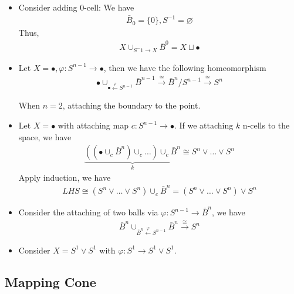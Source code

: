 \documentclass[Total.tex]{subfiles}
\begin{document}
	
	\begin{example}
		\begin{itemize}
			\item Consider adding $0$-cell: We have
			\begin{gather*}
				\bar{B}_0=\{0\},S^{-1}=\varnothing
			\end{gather*}
			Thus,
			\begin{gather*}
				X\cup_{S^-1\rightarrow X} \bar{B}^0=X\sqcup \bullet
			\end{gather*}
			\item Let $X=\bullet,\varphi:S^{n-1}\rightarrow \bullet$, then we have the following homeomorphism
			\begin{gather*}
				\bullet\cup_{\bullet\stackrel{\varphi}{\leftarrow}S^{n-1}} \bar{B}^{n-1}\stackrel{\cong}{\rightarrow} \bar{B}^n/S^{n-1}\stackrel{\cong}{\rightarrow} S^n
			\end{gather*}
			
			When $n=2$, attaching the boundary to the point.
			\item Let $X=\bullet$ with attaching map $c:S^{n-1}\rightarrow \bullet$. If we attaching $k$ n-cells to the space, we have
			\begin{gather*}
				\underbrace{((\bullet \cup_c \bar{B}^n)\cup_c\dots)\cup_c \bar{B}^n}_{k}\cong S^n\vee\dots\vee S^n
			\end{gather*}
			Apply induction, we have
			\begin{gather*}
				LHS\cong (S^n\vee\dots\vee S^n)\cup_c \bar{B}^n=(S^n\vee\dots\vee S^n)\vee S^n
			\end{gather*}
			\item Consider the attaching of two balls via $\varphi:S^{n-1}\rightarrow\bar{B}^n$, we have
			\begin{gather*}
				\bar{B}^n\cup_{\bar{B}^n\stackrel{\varphi}{\leftarrow} S^{n-1}} \bar{B}^n\stackrel{\cong}{\rightarrow} S^n
			\end{gather*}
			\item Consider $X=S^1\vee S^1$ with $\varphi:S^1\rightarrow S^1\vee S^1$. 
		\end{itemize}
	\end{example}
	
	\subsection{Mapping Cone}
	
	
\end{document}
